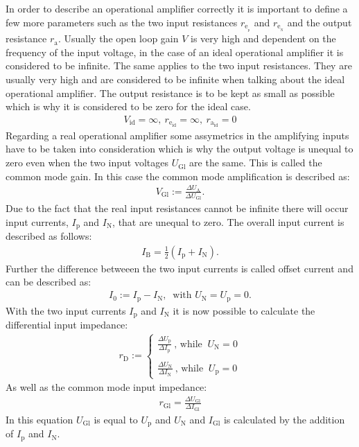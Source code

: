 \noindent In order to describe an operational amplifier correctly it is important to define
a few more parameters such as the two input resistances $r_{\text{e}_{{}_\text{p}}}$
and $r_{\text{e}_{{}_\text{N}}}$ and the output resistance $r_{\text{a}}$.
Usually the open loop gain $V$ is very high and dependent on the frequency of the
input voltage, in the case of an ideal operational amplifier it is considered to
be infinite. The same applies to the two input resistances. They are usually very
high and are considered to be infinite when talking about the ideal operational
amplifier. The output resistance is to be kept as small as possible which is why
it is considered to be zero for the ideal case.
\begin{align*}
    V_{\text{id}}=\infty,~ r_{\text{e}_{\text{id}}}=\infty,~ r_{\text{a}_{\text{id}}}=0
\end{align*}
Regarding a real operational amplifier some assymetrics in the amplifying inputs
have to be taken into consideration which is why the output voltage is unequal to
zero even when the two input voltages $U_{\text{Gl}}$ are the same. This is
called the common mode gain. In this case the common mode amplification is described
as:
\begin{align*}
    V_{\text{Gl}}:=\frac{\Delta U_{\text{A}}}{\Delta U_{\text{Gl}}}.
\end{align*}
Due to the fact that the real input resistances cannot be infinite there will occur
input currents, $I_{\text{p}}$ and $I_{\text{N}}$, that are unequal to zero.
The overall input current is described as follows:
\begin{align*}
    I_{\text{B}} = \frac{1}{2} \left( I_{\text{p}} + I_{\text{N}} \right).
\end{align*}
Further the difference betweeen the two input currents is called offset current
and can be described as:
\begin{align*}
    I_0:=I_{\text{p}} - I_{\text{N}} ,~ \text{ with } U_{\text{N}} = U_{\text{p}} = 0 .
\end{align*}
With the two input currents $I_{\text{p}}$ and $I_{\text{N}}$ it is now possible
to calculate the differential input impedance:
\begin{align*}
    r_\text{D}:=
	\begin{cases}
		\frac{\Delta U_{\text{p}}}{\Delta I_{\text{p}}} ~ \text{, while }~ U_{\text{N}} = 0   \\
		\\
		\frac{\Delta U_{\text{N}}}{\Delta I_{\text{N}}} ~ \text{, while }~ U_\text{p}=0
\end{cases}
\end{align*}
As well as the common mode input impedance:
\begin{align*}
    r_{\text{Gl}} = \frac{\Delta U_{\text{Gl}}}{\Delta I_{\text{Gl}}}
\end{align*}
In this equation $U_{\text{Gl}}$ is equal to $U_{\text{p}}$ and $U_{\text{N}}$ and
$I_{\text{Gl}}$ is calculated by the addition of $I_{\text{p}}$ and $I_{\text{N}}$.

